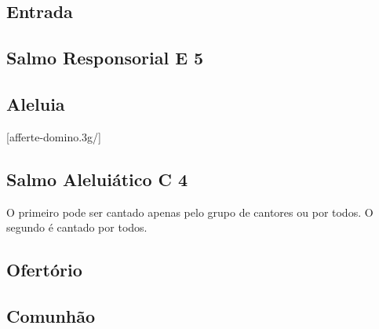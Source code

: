 
\subsection{Entrada}\label{subsection:tempus-per-annum/domini-nostri-iesu-christi-universorum-regis/introitus}

\AllowPageFlush

\subsection[Salmo Responsorial]{Salmo Responsorial \textmd{E 5}}\label{subsection:tempus-per-annum/domini-nostri-iesu-christi-universorum-regis/psalmus-responsorius}

\AllowPageFlush

\subsection{Aleluia}
[afferte-domino.3g/]

\AllowPageFlush

\subsection[Salmo Aleluiático]{Salmo Aleluiático \textmd{C 4}}\label{subsection:tempus-per-annum/domini-nostri-iesu-christi-universorum-regis/psalmus-alleluiaticus}
\begin{center}
  \begin{rubrica}
    O primeiro {\normalfont\Rbar} pode ser cantado apenas pelo grupo de cantores ou por todos. O segundo {\normalfont\Rbar} é cantado por todos.
  \end{rubrica}
\end{center}

\AllowPageFlush

\subsection{Ofertório}\label{subsection:tempus-per-annum/domini-nostri-iesu-christi-universorum-regis/offertorium}

\AllowPageFlush

\subsection{Comunhão}\label{subsection:tempus-per-annum/domini-nostri-iesu-christi-universorum-regis/communio}
